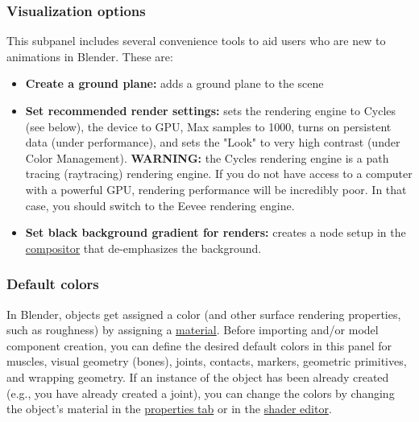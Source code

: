 \documentclass{article}
\begin{document}
\subsubsection{Visualization options}

This subpanel includes several convenience tools to aid users who are new to animations in Blender. These are:

\begin{itemize}
    
    \item \textbf{Create a ground plane:} adds a ground plane to the scene
    \item \textbf{Set recommended render settings:} sets the rendering engine to Cycles (see below), the device to GPU, Max samples to 1000, turns on persistent data (under performance), and sets the "Look" to very high contrast (under Color Management). \textbf{WARNING:} the Cycles rendering engine is a path tracing (raytracing) rendering engine. If you do not have access to a computer with a powerful GPU, rendering performance will be incredibly poor. In that case, you should switch to the Eevee rendering engine.
    \item \textbf{Set black background gradient for renders:} creates a node setup in the \href{https://docs.blender.org/manual/en/latest/compositing/index.html}{compositor} that de-emphasizes the background.
\end{itemize}


\subsubsection{Default colors}
\label{sec:defaultcolors}

In Blender, objects get assigned a color (and other surface rendering properties, such as roughness) by assigning a \href{https://docs.blender.org/manual/en/latest/editors/properties_editor.html}{material}. Before importing and/or model component creation, you can define the desired default colors in this panel for muscles, visual geometry (bones), joints, contacts, markers, geometric primitives, and wrapping geometry. If an instance of the object has been already created (e.g., you have already created a joint), you can change the colors by changing the object's material in the \href{https://docs.blender.org/manual/en/latest/editors/properties_editor.html}{properties tab} or in the \href{https://docs.blender.org/manual/en/latest/editors/shader_editor.html}{shader editor}. 
\end{document}
